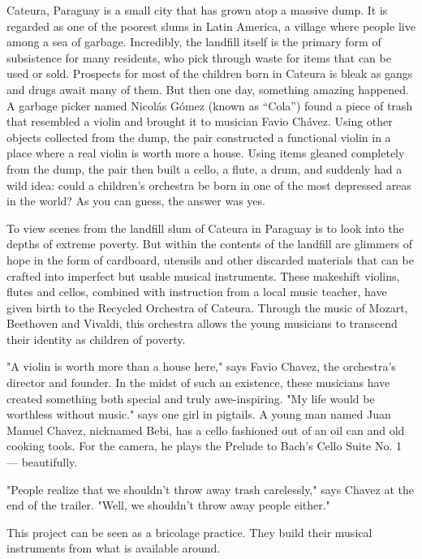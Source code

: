 \begin{itemize}
Cateura, Paraguay is a small city that has grown atop a massive dump. It is regarded as one of the poorest slums in Latin America, a village where people live among a sea of garbage. Incredibly, the landfill itself is the primary form of subsistence for many residents, who pick through waste for items that can be used or sold. Prospects for most of the children born in Cateura is bleak as gangs and drugs await many of them. But then one day, something amazing happened. A garbage picker named Nicolás Gómez (known as “Cola”) found a piece of trash that resembled a violin and brought it to musician Favio Chávez. Using other objects collected from the dump, the pair constructed a functional violin in a place where a real violin is worth more a house. Using items gleaned completely from the dump, the pair then built a cello, a flute, a drum, and suddenly had a wild idea: could a children’s orchestra be born in one of the most depressed areas in the world? As you can guess, the answer was yes.

To view scenes from the landfill slum of Cateura in Paraguay is to look into the depths of extreme poverty. But within the contents of the landfill are glimmers of hope in the form of cardboard, utensils and other discarded materials that can be crafted into imperfect but usable musical instruments. These makeshift violins, flutes and cellos, combined with instruction from a local music teacher, have given birth to the Recycled Orchestra of Cateura. Through the music of Mozart, Beethoven and Vivaldi, this orchestra allows the young musicians to transcend their identity as children of poverty.

"A violin is worth more than a house here," says Favio Chavez, the orchestra's director and founder. In the midst of such an existence, these musicians have created something both special and truly awe-inspiring. "My life would be worthless without music." says one girl in pigtails. A young man named Juan Manuel Chavez, nicknamed Bebi, has a cello fashioned out of an oil can and old cooking tools. For the camera, he plays the Prelude to Bach's Cello Suite No. 1 — beautifully.

"People realize that we shouldn't throw away trash carelessly," says Chavez at the end of the trailer. "Well, we shouldn't throw away people either."

This project can be seen as a bricolage practice. They build their musical instruments from what is available around. 


\end{itemize}
